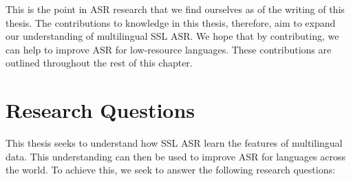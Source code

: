This is the point in ASR research that we find ourselves as of the writing of this thesis. The contributions to knowledge in this thesis, therefore, aim to expand our understanding of multilingual SSL ASR. We hope that by contributing, we can help to improve ASR for low-resource languages. These contributions are outlined throughout the rest of this chapter.




\section{Research Questions}\label{intro_sec:research_questions}

This thesis seeks to understand how SSL ASR learn the features of multilingual data. This understanding can then be used to improve ASR for languages across the world. To achieve this, we seek to answer the following research questions:%

